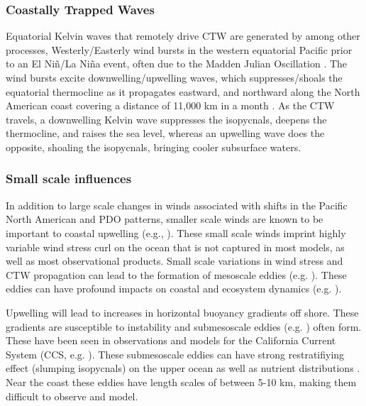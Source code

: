 \subsubsection{Coastally Trapped Waves}
Equatorial Kelvin waves that remotely drive CTW are generated by among other processes, Westerly/Easterly wind bursts in the western equatorial Pacific prior to an El Ni{\~n}/La Ni{\~n}a event\citep{mcphaden1988response,eisenman2005westerly,chiodi2014subseasonal,chen2015strong,fedorov2015impact}, often due to the Madden Julian Oscillation \citep{chen1996multiscale,feng2018assessing,yang2019upscale}.   The wind bursts excite downwelling/upwelling waves, which suppresses/shoals the equatorial thermocline as it propagates eastward, and northward along the North American coast covering a distance of 11,000 km in a month \citep{thomson2010poleward,engida2016remote}. As the CTW travels, a downwelling Kelvin wave suppresses the isopycnals, deepens the thermocline, and raises the sea level, whereas an upwelling wave does the opposite, shoaling the isopycnals, bringing cooler subsurface waters. 

\subsubsection{Small scale influences}
In addition to large scale changes in winds associated with shifts in the Pacific North American and PDO patterns, smaller scale winds are known to be important to coastal upwelling (e.g., \citep{small2014new,capet2004upwelling}).  These small scale winds imprint highly variable wind stress curl on the ocean that is not captured in most models, as well as most observational products.  Small scale variations in wind stress and CTW propagation can lead to the formation of mesoscale eddies (e.g. \citep{lorenzo2004modelling}).  These eddies can have profound impacts on coastal and ecosystem dynamics (e.g. \citep{correa2007mesoscale}).

Upwelling will lead to increases in horizontal buoyancy gradients off shore.  These gradients are susceptible to instability and submesoscale eddies (e.g. \citep{fox2008parameterization}) often form.  These have been seen in observations and models for the California Current System (CCS, e.g. \citep{capet2008mesoscale}).  These submesoscale eddies can have strong restratifiying effect (slumping isopycnals) on the upper ocean \citep{fox2011parameterization} as well as nutrient distributions \citep{brannigan2016intense}.  Near the coast these eddies have length scales of between 5-10 km, making them difficult to observe and model.

